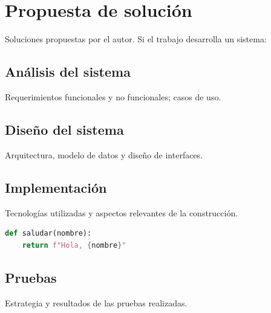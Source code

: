 \section{Propuesta de solución}

Soluciones propuestas por el autor. Si el trabajo desarrolla un sistema:

\subsection{Análisis del sistema}
Requerimientos funcionales y no funcionales; casos de uso.

\subsection{Diseño del sistema}
Arquitectura, modelo de datos y diseño de interfaces.

\subsection{Implementación}
Tecnologías utilizadas y aspectos relevantes de la construcción.

\begin{lstlisting}[language=Python,caption={Ejemplo de fragmento de código}]
def saludar(nombre):
    return f"Hola, {nombre}"
\end{lstlisting}

\subsection{Pruebas}
Estrategia y resultados de las pruebas realizadas.
